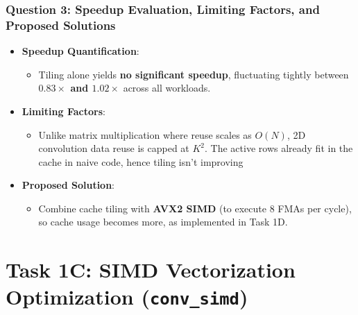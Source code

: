 \documentclass[11pt,a4paper]{article}
\begin{document}
\subsubsection{Question 3: Speedup Evaluation, Limiting Factors, and Proposed Solutions}
\begin{itemize}
    \item \textbf{Speedup Quantification}:
    \begin{itemize}
        \item Tiling alone yields \textbf{no significant speedup}, fluctuating tightly between \textbf{$0.83\times$ and $1.02\times$} across all workloads.
    \end{itemize}
    \item \textbf{Limiting Factors}:
    \begin{itemize}
        \item Unlike matrix multiplication where reuse scales as $O(N)$, 2D convolution data reuse is capped at $K^2$. The active rows already fit in the cache in naive code, hence tiling isn't improving
    \end{itemize}
    \item \textbf{Proposed Solution}:
    \begin{itemize}
        \item Combine cache tiling with \textbf{AVX2 SIMD} (to execute 8 FMAs per cycle), so cache usage becomes more, as implemented in Task 1D.
    \end{itemize}
\end{itemize}

\section{Task 1C: SIMD Vectorization Optimization (\texttt{conv\_simd})}
\end{document}
